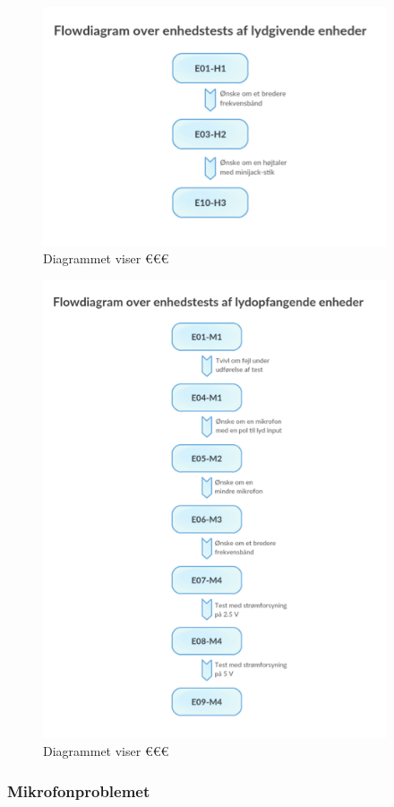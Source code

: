 \begin{figure}[htb]
			\centering
				\includegraphics[width=4in]{flowdiagramelyd}
				\caption{Diagrammet viser €€€}	
				\label{fig:flowdiagramelyd}
			\end{figure}

\begin{figure}[htb]
			\centering
				\includegraphics[width=4in]{flowdiagrameop}
				\caption{Diagrammet viser €€€}	
				\label{fig:flowdiagrameop}
			\end{figure}

\subsubsection{Mikrofonproblemet}

